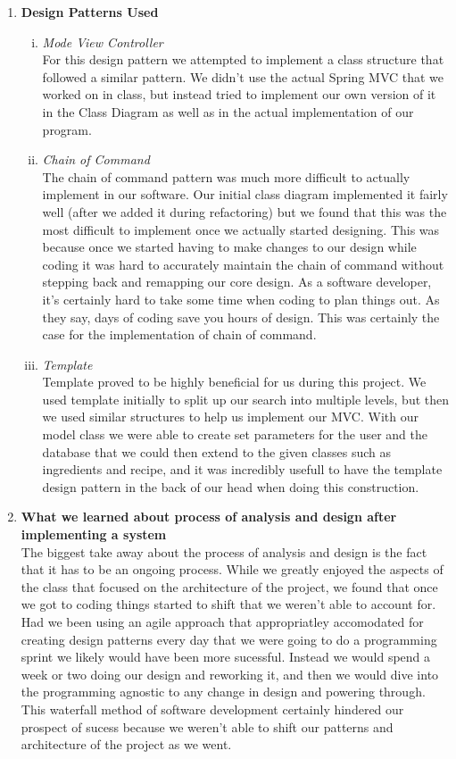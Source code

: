 \documentclass[12pt]{article}
\begin{document}
\begin{enumerate}
  \newpage
  \item \textbf{Design Patterns Used}
    \begin{enumerate}[i.]
      \item \textit{Mode View Controller} \\
        For this design pattern we attempted to implement a class structure that followed a similar pattern.
        We didn't use the actual Spring MVC that we worked on in class, but instead tried to implement 
        our own version of it in the Class Diagram as well as in the actual implementation of our program.
      \item \textit{Chain of Command} \\ 
        The chain of command pattern was much more difficult to actually implement in our software. Our initial
        class diagram implemented it fairly well (after we added it during refactoring) but we found that this
        was the most difficult to implement once we actually started designing. This was because once we started 
        having to make changes to our design while coding it was hard to accurately maintain the chain of command
        without stepping back and remapping our core design. As a software developer, it's certainly hard to 
        take some time when coding to plan things out. As they say, days of coding save you hours of design. 
        This was certainly the case for the implementation of chain of command.
      \item \textit{Template} \\
        Template proved to be highly beneficial for us during this project. We used template initially to 
        split up our search into multiple levels, but then we used similar structures to help us implement our MVC.
        With our model class we were able to create set parameters for the user and the database that we could then
        extend to the given classes such as ingredients and recipe, and it was incredibly usefull to have the template
        design pattern in the back of our head when doing this construction.
    \end{enumerate}
  \newpage
  \item \textbf{What we learned about process of analysis and design after implementing a system} 
    \vspace{1cm}
    \\
    The biggest take away about the process of analysis and design is the fact that it has to be an ongoing process.
    While we greatly enjoyed the aspects of the class that focused on the architecture of the project, we found that
    once we got to coding things started to shift that we weren't able to account for. Had we been using an agile
    approach that appropriatley accomodated for creating design patterns every day that we were going to do a 
    programming sprint we likely would have been more sucessful. Instead we would spend a week or two doing our
    design and reworking it, and then we would dive into the programming agnostic to any change in design and powering
    through. This waterfall method of software development certainly hindered our prospect of sucess because we
    weren't able to shift our patterns and architecture of the project as we went.
   \end{enumerate}
\end{document}
